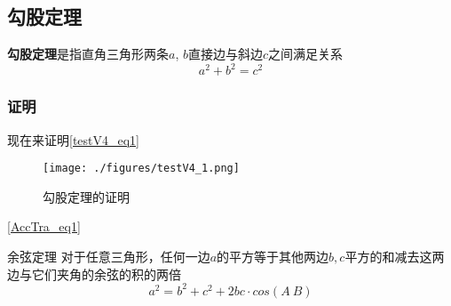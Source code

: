 
\subsection{勾股定理}
\textbf{勾股定理}是指直角三角形两条$a$, $b$直接边与斜边$c$之间满足关系
\begin{equation}\label{testV4_eq1}
a^2 + b^2 = c^2
\end{equation}

\subsubsection{证明}
现在来证明\autoref{testV4_eq1}

\begin{figure}[ht]
\centering
\texttt{[image: ./figures/testV4\_1.png]}
\caption{勾股定理的证明} \label{testV4_fig1}
\end{figure}
\autoref{AccTra_eq1}
\begin{theorem}{余弦定理}
对于任意三角形，任何一边$a$的平方等于其他两边$b, c$平方的和减去这两边与它们夹角的余弦的积的两倍
\begin{equation}
a^2 = b^2 + c^2 + 2bc\cdot cos(A~B)
\end{equation}
\end{theorem}